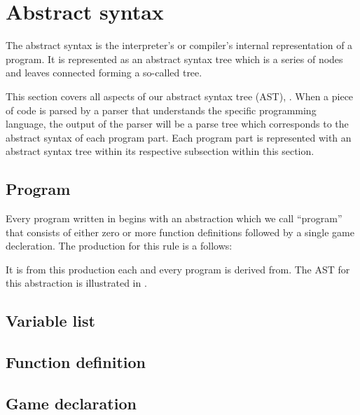 \section{Abstract syntax}

The abstract syntax is the interpreter's or compiler's internal representation of a program. It is represented as an abstract syntax tree which is a series of nodes and leaves connected forming a so-called tree.

This section covers all aspects of our abstract syntax tree (AST), . When a piece of code is parsed by a parser that understands the specific programming language, the output of the parser will be a parse tree which corresponds to the abstract syntax of each program part. Each program part is represented with an abstract syntax tree within its respective subsection within this section.

\subsection{Program}
Every program written in \productname{} begins with an abstraction which we call ``program'' that consists of either zero or more function definitions followed by a single game decleration. The production for this rule is a follows:

\begin{ebnf}
\end{ebnf}

It is from this production each and every program is derived from. The AST for this abstraction is illustrated in .



\subsection{Variable list}



\subsection{Function definition}



\subsection{Game declaration}

